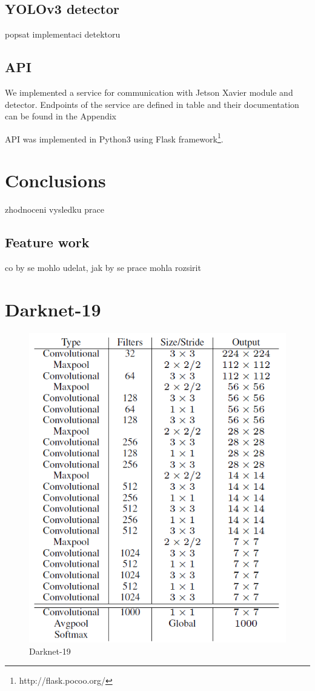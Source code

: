 \documentclass[twoside]{ctuthesis}
\theoremstyle{plain}
\theoremstyle{definition}
\theoremstyle{note}
\begin{document}
\section{YOLOv3 detector}
popsat implementaci detektoru
\section{API}

We implemented a service for communication with Jetson Xavier module and detector. Endpoints of the service are defined in table and their documentation can be found in the Appendix 

API was implemented in Python3 using Flask framework\footnote{http://flask.pocoo.org/}.

\chapter{Conclusions}
zhodnoceni vysledku prace
\section{Feature work}
co by se mohlo udelat, jak by se prace mohla rozsirit
\appendix
\chapter{Darknet-19}
\label{darknet-19}
\begin{figure}[H]
\caption{Darknet-19}
\includegraphics[width=.9\textwidth]{images/used_networks/yolov2_darknet.png}
\end{figure}
\end{document}
